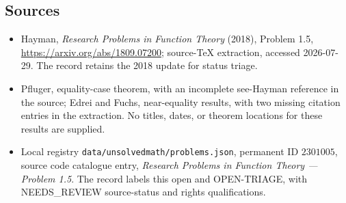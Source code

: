 \documentclass[11pt]{article}
\begin{document}
\subsection{Sources}
\begin{itemize}
\item Hayman, \emph{Research Problems in Function Theory} (2018), Problem 1.5, \url{https://arxiv.org/abs/1809.07200}; source-TeX extraction, accessed 2026-07-29. The record retains the 2018 update for status triage.
\item Pfluger, equality-case theorem, with an incomplete see-Hayman reference in the source; Edrei and Fuchs, near-equality results, with two missing citation entries in the extraction. No titles, dates, or theorem locations for these results are supplied.
\item Local registry \texttt{data/unsolvedmath/problems.json}, permanent ID $2301005$, source code catalogue entry, \emph{Research Problems in Function Theory --- Problem 1.5}. The record labels this open and OPEN-TRIAGE, with NEEDS\_REVIEW source-status and rights qualifications.
\end{itemize}
\end{document}
